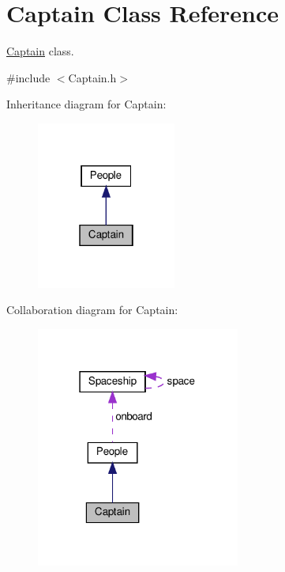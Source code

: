 \hypertarget{classCaptain}{}\section{Captain Class Reference}
\label{classCaptain}


\hyperlink{classCaptain}{Captain} class.  




{\ttfamily \#include $<$Captain.\+h$>$}



Inheritance diagram for Captain\+:\nopagebreak
\begin{figure}[H]
\begin{center}
\leavevmode
\includegraphics[width=130pt]{classCaptain__inherit__graph}
\end{center}
\end{figure}


Collaboration diagram for Captain\+:\nopagebreak
\begin{figure}[H]
\begin{center}
\leavevmode
\includegraphics[width=190pt]{classCaptain__coll__graph}
\end{center}
\end{figure}
